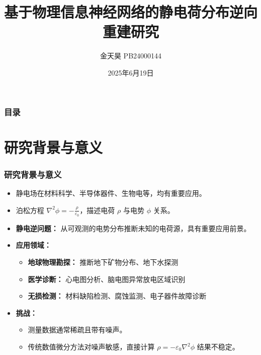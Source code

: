 \documentclass[aspectratio=169]{ctexbeamer}
\title[静电逆问题PINN]{ %
    基于物理信息神经网络的静电荷分布逆向重建研究
}
\author[金天昊]{金天昊 PB24000144} %
\institute[USTC]{
    中国科学技术大学
}
\date{2025年6月19日}
\begin{document}
\maketitleframe

\begin{frame}
    \frametitle{目录}
    \tableofcontents[hideallsubsections] %
\end{frame}


\section{研究背景与意义}
\begin{frame}
	\frametitle{研究背景与意义}
	\begin{itemize}
		\item 静电场在材料科学、半导体器件、生物电等，均有重要应用。
		\item 泊松方程 $\nabla^2\phi = -\frac{\rho}{\varepsilon_0}$，描述电荷 $\rho$ 与电势 $\phi$ 关系。
		\item \textbf{静电逆问题：} 从可观测的电势分布推断未知的电荷源，具有重要应用前景。
		\pause
		\item \textbf{应用领域：}
		\begin{itemize}
				\item \textbf{地球物理勘探：} 推断地下矿物分布、地下水探测
				\item \textbf{医学诊断：} 心电图分析、脑电图异常放电区域识别
				\item \textbf{无损检测：} 材料缺陷检测、腐蚀监测、电子器件故障诊断
		\end{itemize}
		\pause
		\item \textbf{挑战：}
		\begin{itemize}
				\item 测量数据通常稀疏且带有噪声。
				\item 传统数值微分方法对噪声敏感，直接计算 $\rho = -\varepsilon_0 \nabla^2\phi$ 结果不稳定。
		\end{itemize}
	\end{itemize}
\end{frame}
\end{document}
